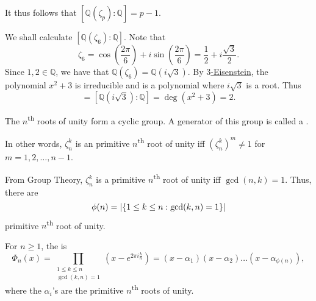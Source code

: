 \documentclass[notoc,notitlepage,nobib]{tufte-book}
\begin{document}
It thus follows that $[ \mathbb{Q}(\zeta_p) : \mathbb{Q} ] = p - 1$.

\begin{eg}
  We shall calculate $[ \mathbb{Q}(\zeta_6) : \mathbb{Q} ]$. Note that
  \begin{equation*}
    \zeta_6 = \cos \left( \frac{2 \pi}{6} \right) + i \sin \left( \frac{2 \pi}{6} \right) =
    \frac{1}{2} + i \frac{\sqrt{3}}{2}.
  \end{equation*}
  Since $1, 2 \in \mathbb{Q}$, we have that $\mathbb{Q}(\zeta_6) = \mathbb{Q}(i \sqrt{3})$.
  By \hyperref[propo:eisenstein_s_criterion]{$3$-Eisenstein}, the polynomial $x^2 + 3$ is
  irreducible and is a polynomial where $i \sqrt{3}$ is a root. Thus
  \begin{equation*}
    [ \mathbb{Q}(\zeta_6) : \mathbb{Q} ] = [ \mathbb{Q}(i \sqrt{3}) : \mathbb{Q} ] = \deg
      (x^2 + 3) = 2.
  \end{equation*}
\end{eg}

\begin{remark}
  The $n$\textsuperscript{th} roots of unity form a cyclic group. A generator of this
  group is called a .

  In other words, $\zeta_n^k$ is an primitive $n$\textsuperscript{th} root of unity iff
  $(\zeta_n^k)^m \neq 1$ for $m = 1, 2, \ldots, n - 1$.

  From Group Theory, $\zeta_n^k$ is a primitive $n$\textsuperscript{th} root of unity iff
  $\gcd(n, k) = 1$. Thus, there are
  \begin{equation*}
    \phi(n) = \left| \{ 1 \leq k \leq n : \gcd(k, n) = 1 \} \right|
  \end{equation*}
  primitive $n$\textsuperscript{th} root of unity.
\end{remark}

\begin{defn}\label{defn:_n_th_cyclotomic_polynomial}
  For $n \geq 1$, the  is
  \begin{equation*}
    \Phi_n(x) = \prod_{\substack{1 \leq k \leq n \\ \gcd(k, n) = 1}} \left( x - e^{2 \pi i
    \frac{k}{n}} \right) = (x - \alpha_1)(x - \alpha_2) \hdots (x - \alpha_{\phi(n)}),
  \end{equation*}
  where the $\alpha_i$'s are the primitive $n$\textsuperscript{th} roots of unity.
\end{defn}
\end{document}
